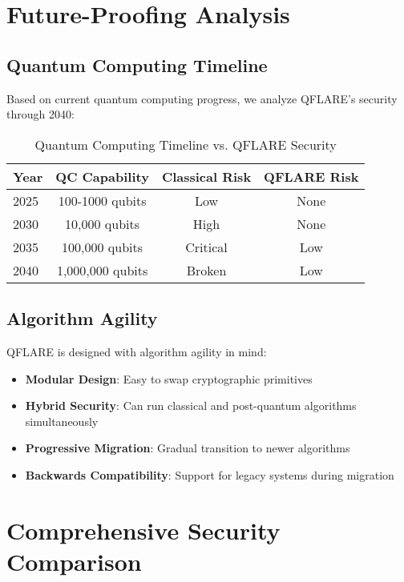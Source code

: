 \documentclass[onecolumn,11pt]{article}
\begin{document}
\section{Future-Proofing Analysis}

\subsection{Quantum Computing Timeline}

Based on current quantum computing progress, we analyze QFLARE's security through 2040:

\begin{table}[htbp]
\centering
\caption{Quantum Computing Timeline vs. QFLARE Security}
\begin{tabular}{|l|c|c|c|}
\hline
\textbf{Year} & \textbf{QC Capability} & \textbf{Classical Risk} & \textbf{QFLARE Risk} \\
\hline
2025 & 100-1000 qubits & Low & None \\
2030 & 10,000 qubits & High & None \\  
2035 & 100,000 qubits & Critical & Low \\
2040 & 1,000,000 qubits & Broken & Low \\
\hline
\end{tabular}
\end{table}

\subsection{Algorithm Agility}

QFLARE is designed with algorithm agility in mind:

\begin{itemize}
\item \textbf{Modular Design}: Easy to swap cryptographic primitives
\item \textbf{Hybrid Security}: Can run classical and post-quantum algorithms simultaneously
\item \textbf{Progressive Migration}: Gradual transition to newer algorithms
\item \textbf{Backwards Compatibility}: Support for legacy systems during migration
\end{itemize}

\section{Comprehensive Security Comparison}
\end{document}
